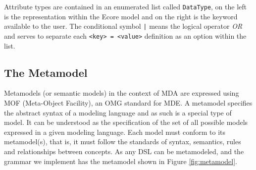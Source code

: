 Attribute types are contained in an enumerated list called \texttt{DataType}, on the left is the representation within the Ecore model and on the right is the keyword available to the user.
The conditional symbol \texttt{|} means the logical operator \textit{OR} and serves to separate each \texttt{<key> = <value>} definition as an option within the list.

\subsection{The Metamodel}

Metamodels (or semantic models) in the context of MDA are expressed using MOF (Meta-Object Facility), an OMG standard for MDE.
A metamodel specifies the abstract syntax of a modeling language and as such is a special type of model.
It can be understood as the specification of the set of all possible models expressed in a given modeling language.
Each model must conform to its metamodel(s), that is, it must follow the standards of syntax, semantics, rules and relationships between concepts.
As any DSL can be metamodeled, and the grammar we implement has the metamodel shown in Figure \ref{fig:metamodel}.


%   

